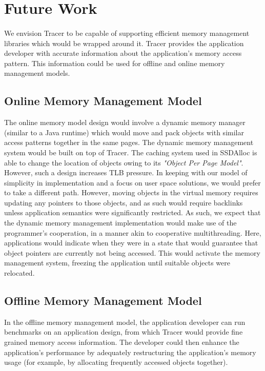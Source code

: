 \section{Future Work}
\label{sec:futurework}
\paragraph{}
We envision Tracer to be capable of supporting efficient memory management libraries which would be wrapped around it. Tracer provides the application developer with accurate information about the application's memory access pattern. This information could be used for offline and online memory management models.

\subsection{Online Memory Management Model}
The online memory model design would involve a dynamic memory manager (similar to a Java runtime) which would move and pack objects with similar access patterns together in the same pages. The dynamic memory management system would be built on top of Tracer. The caching system used in SSDAlloc is able to change the location of objects owing to its {\emph{"Object Per Page Model"}}. However, such a design increases TLB pressure. In keeping with our model of simplicity in implementation and a focus on user space solutions, we would prefer to take a different path. However, moving objects in the virtual memory requires updating any pointers to those objects, and as such would require backlinks unless application semantics were significantly restricted. As such, we expect that the dynamic memory management implementation would make use of the programmer's cooperation, in a manner akin to cooperative multithreading. Here, applications would indicate when they were in a state that would guarantee that object pointers are currently not being accessed. This would activate the memory management system, freezing the application until suitable objects were relocated.

\subsection{Offline Memory Management Model}
In the offline memory management model, the application developer can run benchmarks on an application design, from which Tracer would provide fine grained memory access information. The developer could then enhance the application's performance by adequately restructuring the application's memory usage (for example, by allocating frequently accessed objects together).

